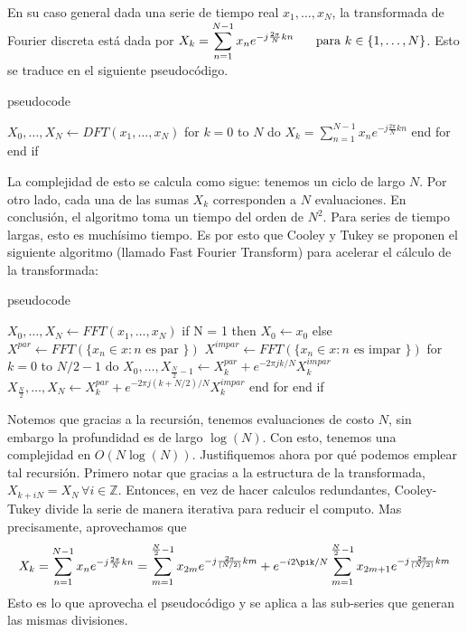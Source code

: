 \documentclass[letterpaper,11pt,oneside]{article}
\theoremstyle{break}
\begin{document}
En su caso general dada una serie de tiempo real $x_1,\dots,x_N$, la transformada de Fourier discreta está dada por $ X_k = \displaystyle \sum^{N-1}_{n=1}x_n e^{-j \frac{2\pi}{N} kn} \hspace{.5cm}\text{ para }k\in\{1,\dots,N\} $.
Esto se traduce en el siguiente pseudocódigo.
\begin{sourcecodep}{pseudocode}{}

$X_0,\dots,X_N \leftarrow DFT(x_1,\dots,x_N)$
    for $k = 0$ to $N$ do
        $X_k =\displaystyle \sum^{N-1}_{n=1}x_n e^{-j \frac{2\pi}{N} kn}$
    end for
end if
\end{sourcecodep}

La complejidad de esto se calcula como sigue: tenemos un ciclo de largo $N$. Por otro lado, cada una de las sumas $X_k$ corresponden a $N$ evaluaciones. En conclusión, el algoritmo toma un tiempo del orden de $N^2$. Para series de tiempo largas, esto es muchísimo tiempo. Es por esto que Cooley y Tukey se proponen el siguiente algoritmo (llamado Fast Fourier Transform) para acelerar el cálculo de la transformada:
\begin{sourcecodep}{pseudocode}{}

$X_0,\dots,X_N \leftarrow FFT(x_1,\dots,x_N)$
    if N = 1 then
        $X_0 \leftarrow x_0$
    else
        $X^{par} \leftarrow FFT(\{x_n\in x:n \text{ es par }\})$
        $X^{impar} \leftarrow FFT(\{x_n\in x:n \text{ es impar }\})$
        for $k = 0$ to $N/2−1$ do
            $X_0,\dots,X_{\frac{N}{2}−1} \leftarrow X^{par}_k+e^{-2\pi j k/N}X^{impar}_k$
            $X_{\frac{N}{2}},\dots,X_N \leftarrow X^{par}_k+e^{-2\pi j (k+N/2)/N}X^{impar}_k$
        end for
    end if
\end{sourcecodep}
Notemos que gracias a la recursión, tenemos evaluaciones de costo $N$, sin embargo la profundidad es de largo $\log(N)$. Con esto, tenemos una complejidad en $O(N\log(N))$. Justifiquemos ahora por qué podemos emplear tal recursión. Primero notar que gracias a la estructura de la transformada, $X_{k+iN}=X_N\,\forall i\in\mathbb{Z}$. Entonces, en vez de hacer calculos redundantes, Cooley-Tukey divide la serie de manera iterativa para reducir el computo. Mas precisamente, aprovechamos que
$$ X_k = \displaystyle \sum^{N-1}_{n=1}x_n e^{-j \frac{2\pi}{N} kn} = \sum^{\frac{N}{2}-1}_{m=1}x_{2m} e^{-j \frac{2\pi}{(N/2)} km}+e^{-i2\pik/N}\sum^{\frac{N}{2}-1}_{m=1}x_{2m+1} e^{-j \frac{2\pi}{(N/2)} km}$$
Esto es lo que aprovecha el pseudocódigo y se aplica a las sub-series que generan las mismas divisiones.
\end{document}
